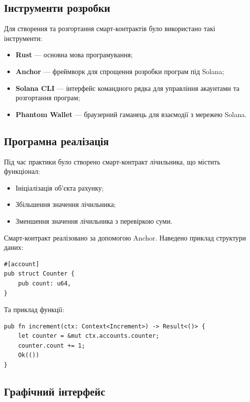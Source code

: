 \documentclass[14pt]{extreport}
\begin{document}
\subsection{Інструменти розробки}

Для створення та розгортання смарт-контрактів було використано такі інструменти:
\begin{itemize}
    \item \textbf{Rust} — основна мова програмування;
    \item \textbf{Anchor} — фреймворк для спрощення розробки програм під Solana;
    \item \textbf{Solana CLI} — інтерфейс командного рядка для управління акаунтами та розгортання програм;
    \item \textbf{Phantom Wallet} — браузерний гаманець для взаємодії з мережею Solana.
\end{itemize}

\subsection{Програмна реалізація}

Під час практики було створено смарт-контракт лічильника, що містить функціонал:
\begin{itemize}
    \item Ініціалізація об’єкта рахунку;
    \item Збільшення значення лічильника;
    \item Зменшення значення лічильника з перевіркою суми.
\end{itemize}

Смарт-контракт реалізовано за допомогою Anchor. Наведено приклад структури даних:

\begin{verbatim}
#[account]
pub struct Counter {
    pub count: u64,
}
\end{verbatim}

Та приклад функції:

\begin{verbatim}
pub fn increment(ctx: Context<Increment>) -> Result<()> {
    let counter = &mut ctx.accounts.counter;
    counter.count += 1;
    Ok(())
}
\end{verbatim}

\subsection{Графічний інтерфейс}
\end{document}
